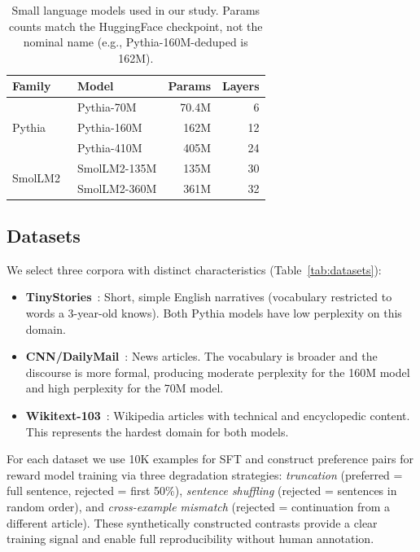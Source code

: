 \documentclass[10pt,twocolumn,letterpaper]{article}
\begin{document}
\begin{table}[h]
\centering
\caption{Small language models used in our study. Params counts match the HuggingFace checkpoint, not the nominal name (e.g., Pythia-160M-deduped is 162M).}
\label{tab:models}
\small
\setlength{\tabcolsep}{4pt}
\begin{tabular}{llrr}
\toprule
\textbf{Family} & \textbf{Model} & \textbf{Params} & \textbf{Layers} \\
\midrule
\multirow{3}{*}{Pythia~\cite{biderman2023pythia}}
  & Pythia-70M   & 70.4M  & 6  \\
  & Pythia-160M  & 162M   & 12 \\
  & Pythia-410M  & 405M   & 24 \\
\midrule
\multirow{2}{*}{SmolLM2~\cite{allal2025smollm2}}
  & SmolLM2-135M & 135M   & 30 \\
  & SmolLM2-360M & 361M   & 32 \\
\bottomrule
\end{tabular}
\end{table}

\subsection{Datasets}
\label{sec:datasets}

We select three corpora with distinct characteristics (Table~\ref{tab:datasets}):

\begin{itemize}[topsep=2pt, itemsep=1pt]
  \item \textbf{TinyStories}~\cite{eldan2023tinystories}: Short, simple English narratives (vocabulary restricted to words a 3-year-old knows). Both Pythia models have low perplexity on this domain.
  \item \textbf{CNN/DailyMail}~\cite{nallapati2016abstractive}: News articles. The vocabulary is broader and the discourse is more formal, producing moderate perplexity for the 160M model and high perplexity for the 70M model.
  \item \textbf{Wikitext-103}~\cite{merity2016pointer}: Wikipedia articles with technical and encyclopedic content. This represents the hardest domain for both models.
\end{itemize}

For each dataset we use 10K examples for SFT and construct preference pairs for reward model training via three degradation strategies: \emph{truncation} (preferred = full sentence, rejected = first 50\%), \emph{sentence shuffling} (rejected = sentences in random order), and \emph{cross-example mismatch} (rejected = continuation from a different article). These synthetically constructed contrasts provide a clear training signal and enable full reproducibility without human annotation.
\end{document}

